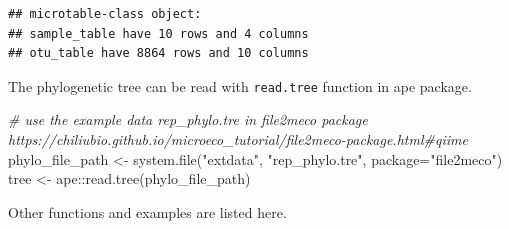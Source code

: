\documentclass[
]{book}
\newenvironment{Shaded}{\begin{snugshade}}{\end{snugshade}}
\newcommand{\AttributeTok}[1]{\textcolor[rgb]{0.77,0.63,0.00}{#1}}
\newcommand{\CommentTok}[1]{\textcolor[rgb]{0.56,0.35,0.01}{\textit{#1}}}
\newcommand{\DecValTok}[1]{\textcolor[rgb]{0.00,0.00,0.81}{#1}}
\newcommand{\FunctionTok}[1]{\textcolor[rgb]{0.00,0.00,0.00}{#1}}
\newcommand{\NormalTok}[1]{#1}
\newcommand{\OtherTok}[1]{\textcolor[rgb]{0.56,0.35,0.01}{#1}}
\newcommand{\SpecialCharTok}[1]{\textcolor[rgb]{0.00,0.00,0.00}{#1}}
\newcommand{\StringTok}[1]{\textcolor[rgb]{0.31,0.60,0.02}{#1}}
\begin{document}
\begin{verbatim}
## microtable-class object:
## sample_table have 10 rows and 4 columns
## otu_table have 8864 rows and 10 columns
\end{verbatim}

The phylogenetic tree can be read with \texttt{read.tree} function in ape package.

\begin{Shaded}
\begin{Highlighting}[]
\CommentTok{\# use the example data rep\_phylo.tre in file2meco package https://chiliubio.github.io/microeco\_tutorial/file2meco{-}package.html\#qiime}
\NormalTok{phylo\_file\_path }\OtherTok{\textless{}{-}} \FunctionTok{system.file}\NormalTok{(}\StringTok{"extdata"}\NormalTok{, }\StringTok{"rep\_phylo.tre"}\NormalTok{, }\AttributeTok{package=}\StringTok{"file2meco"}\NormalTok{)}
\NormalTok{tree }\OtherTok{\textless{}{-}}\NormalTok{ ape}\SpecialCharTok{::}\FunctionTok{read.tree}\NormalTok{(phylo\_file\_path)}
\end{Highlighting}
\end{Shaded}

Other functions and examples are listed here.

\begin{Shaded}
\end{Shaded}
\end{document}
